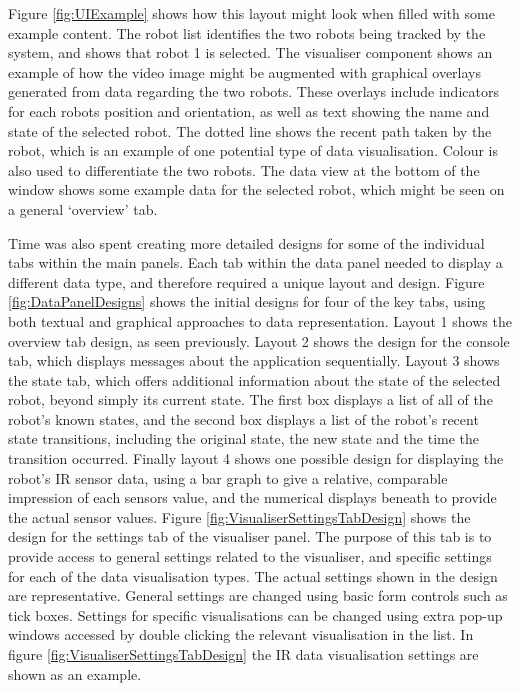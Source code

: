 Figure \ref{fig:UIExample} shows how this layout might look when filled with some example content. The robot list identifies the two robots being tracked by the system, and shows that robot 1 is selected. The visualiser component shows an example of how the video image might be augmented with graphical overlays generated from data regarding the two robots. These overlays include indicators for each robots position and orientation, as well as text showing the name and state of the selected robot. The dotted line shows the recent path taken by the robot, which is an example of one potential type of data visualisation. Colour is also used to differentiate the two robots. The data view at the bottom of the window shows some example data for the selected robot, which might be seen on a general `overview' tab.

Time was also spent creating more detailed designs for some of the individual tabs within the main panels. Each tab within the data panel needed to display a different data type, and therefore required a unique layout and design. Figure \ref{fig:DataPanelDesigns} shows the initial designs for four of the key tabs, using both textual and graphical approaches to data representation. Layout 1 shows the overview tab design, as seen previously. Layout 2 shows the design for the console tab, which displays messages about the application sequentially. Layout 3 shows the state tab, which offers additional information about the state of the selected robot, beyond simply its current state. The first box displays a list of all of the robot's known states, and the second box displays a list of the robot's recent state transitions, including the original state, the new state and the time the transition occurred. Finally layout 4 shows one possible design for displaying the robot's IR sensor data, using a bar graph to give a relative, comparable impression of each sensors value, and the numerical displays beneath to provide the actual sensor values. Figure \ref{fig:VisualiserSettingsTabDesign} shows the design for the settings tab of the visualiser panel. The purpose of this tab is to provide access to general settings related to the visualiser, and specific settings for each of the data visualisation types. The actual settings shown in the design are representative. General settings are changed using basic form controls such as tick boxes. Settings for specific visualisations can be changed using extra pop-up windows accessed by double clicking the relevant visualisation in the list. In figure \ref{fig:VisualiserSettingsTabDesign} the IR data visualisation settings are shown as an example.

